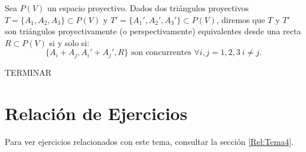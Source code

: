 \begin{definicion}
    Sea $P(V)$ un espacio proyectivo.
    Dados dos triángulos proyectivos $T = \{A_1, A_2, A_3\}\subset P(V)$ y $T' = \{A_1', A_2', A_3'\}\subset P(V)$,
    diremos que $T$ y $T'$ son triángulos proyectivamente (o perspectivamente) equivalentes desde una recta $R \subset P(V)$ si y solo si:
    \begin{equation*}
        \{A_i + A_j, A_i' + A_j', R\} \text{ son concurrentes } \forall i,j=1,2,3~i\neq j.
    \end{equation*}
\end{definicion}



TERMINAR %




\section{Relación de Ejercicios}

Para ver ejercicios relacionados con este tema, consultar la sección \ref{Rel:Tema4}.